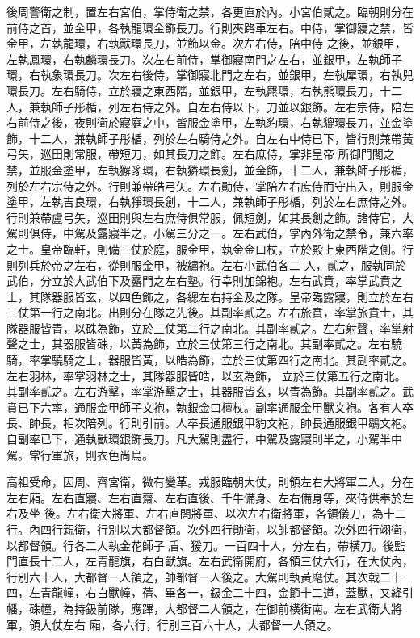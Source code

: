 \begin{pinyinscope}
 後周警衛之制，置左右宮伯，掌侍衛之禁，各更直於內。小宮伯貳之。臨朝則分在前侍之首，並金甲，各執龍環金飾長刀。行則夾路車左右。中侍，掌御寢之禁，皆金甲，左執龍環，右執獸環長刀，並飾以金。次左右侍，陪中侍
 之後，並銀甲，左執鳳環，右執麟環長刀。次左右前侍，掌御寢南門之左右，並銀甲，左執師子環，右執象環長刀。次左右後侍，掌御寢北門之左右，並銀甲，左執犀環，右執兕環長刀。左右騎侍，立於寢之東西階，並銀甲，左執羆環，右執熊環長刀，十二人，兼執師子彤楯，列左右侍之外。自左右侍以下，刀並以銀飾。左右宗侍，陪左右前侍之後，夜則衛於寢庭之中，皆服金塗甲，左執豹環，右執貔環長刀，並金塗飾，十二人，兼執師子彤楯，列於左右騎侍之外。自左右中侍已下，皆行則兼帶黃弓矢，巡田則常服，帶短刀，如其長刀之飾。左右庶侍，掌非皇帝
 所御門閣之禁，並服金塗甲，左執獬豸環，右執獜環長劍，並金飾，十二人，兼執師子彤楯，列於左右宗侍之外。行則兼帶皓弓矢。左右勛侍，掌陪左右庶侍而守出入，則服金塗甲，左執吉良環，右執猙環長劍，十二人，兼執師子彤楯，列於左右庶侍之外。行則兼帶盧弓矢，巡田則與左右庶侍俱常服，佩短劍，如其長劍之飾。諸侍官，大駕則俱侍，中駕及露寢半之，小駕三分之一。左右武伯，掌內外衛之禁令，兼六率之士。皇帝臨軒，則備三仗於庭，服金甲，執金金口杖，立於殿上東西階之側。行則列兵於帝之左右，從則服金甲，被繡袍。左右小武伯各二
 人，貳之，服執同於武伯，分立於大武伯下及露門之左右塾。行幸則加錦袍。左右武賁，率掌武賁之士，其隊器服皆玄，以四色飾之，各總左右持金及之隊。皇帝臨露寢，則立於左右三仗第一行之南北。出則分在隊之先後。其副率貳之。左右旅賁，率掌旅賁士，其隊器服皆青，以硃為飾，立於三仗第二行之南北。其副率貳之。左右射聲，率掌射聲之士，其器服皆硃，以黃為飾，立於三仗第三行之南北。其副率貳之。左右驍騎，率掌驍騎之士，器服皆黃，以皓為飾，立於三仗第四行之南北。其副率貳之。左右羽林，率掌羽林之士，其隊器服皆皓，以玄為飾，
 立於三仗第五行之南北。其副率貳之。左右游擊，率掌游擊之士，其器服皆玄，以青為飾。其副率貳之。武賁已下六率，通服金甲師子文袍，執銀金口檀杖。副率通服金甲獸文袍。各有人卒長、帥長，相次陪列。行則引前。人卒長通服銀甲豹文袍，帥長通服銀甲鶡文袍。自副率已下，通執獸環銀飾長刀。凡大駕則盡行，中駕及露寢則半之，小駕半中駕。常行軍旅，則衣色尚烏。



 高祖受命，因周、齊宮衛，微有變革。戎服臨朝大仗，則領左右大將軍二人，分在左右廂。左右直寢、左右直齋、左右直後、千牛備身、左右備身等，夾侍供奉於左右及坐
 後。左右衛大將軍、左右直閤將軍、以次左右衛將軍，各領儀刀，為十二行。內四行親衛，行別以大都督領。次外四行勛衛，以帥都督領。次外四行翊衛，以都督領。行各二人執金花師子盾、猨刀。一百四十人，分左右，帶橫刀。後監門直長十二人，左青龍旗，右白獸旗。左右武衛開府，各領三仗六行，在大仗內，行別六十人，大都督一人領之，帥都督一人後之。大駕則執黃麾仗。其次戟二十四，左青龍幢，右白獸幢，蒨、畢各一，鈒金二十四，金節十二道，蓋獸，又絳引幡，硃幢，為持鈒前隊，應蹕，大都督二人領之，在御前橫街南。左右武衛大將軍，領大仗左右
 廂，各六行，行別三百六十人，大都督一人領之。




\end{pinyinscope}
